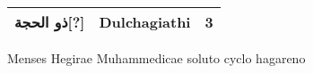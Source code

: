 \begin{tabnums}
\begin{tabular}{@{} r l c @{}}
 \textarabic{ذو الحجة}[?]    & Dulchagiathi        & 3 \\
 \bottomrule
\end{tabular}
%
\caption{Menses Hegirae Muhammedicae soluto cyclo hagareno}
\label{tab:p138}
%
\end{tabnums}
